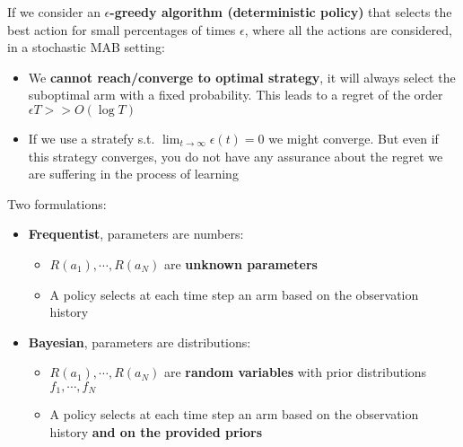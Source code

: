     If we consider an \textbf{$\epsilon$-greedy algorithm (deterministic policy)} that selects the best action for small percentages of times $\epsilon$, where all the actions are considered, in a stochastic MAB setting:
    \begin{itemize}
        \item We \textbf{cannot reach/converge to optimal strategy}, it will always select the suboptimal arm with a fixed probability. This leads to a regret of the order $\epsilon T >> O(\log T)$
        \item If we use a stratefy s.t. $\lim_{t\rightarrow\infty}\epsilon(t)=0$ we might converge. But even if this strategy converges, you do not have any assurance about the regret we are suffering in the process of learning
    \end{itemize}
    Two formulations:
    \begin{itemize}
        \item \textbf{Frequentist}, parameters are numbers:
        \begin{itemize}
            \item $R(a_1),\cdots,R(a_N)$ are \textbf{unknown parameters}
            \item A policy selects at each time step an arm based on the observation history
        \end{itemize}
        \item  \textbf{Bayesian}, parameters are distributions:
        \begin{itemize}
            \item $R(a_1),\cdots,R(a_N)$ are \textbf{random variables} with prior distributions $f_1,\cdots,f_N$
            \item A policy selects at each time step an arm based on the observation history \textbf{and on the provided priors}
        \end{itemize}
    \end{itemize}
